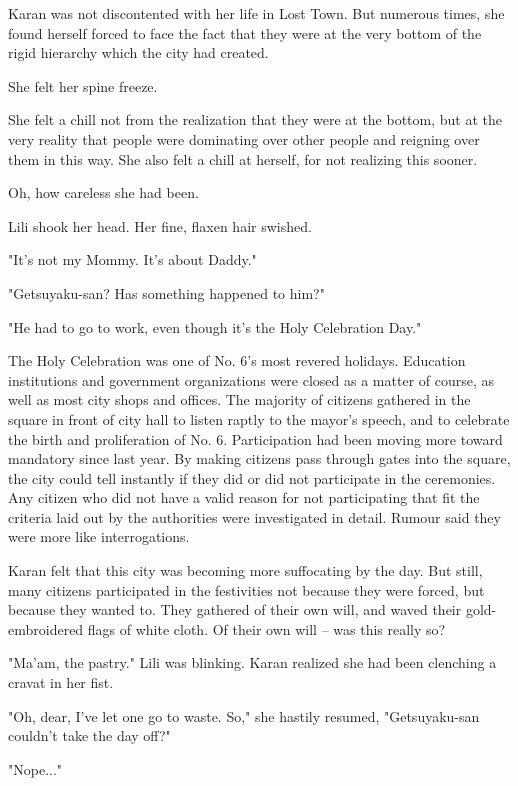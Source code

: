 Karan was not discontented with her life in Lost Town. But numerous
times, she found herself forced to face the fact that they were at the
very bottom of the rigid hierarchy which the city had created.

She felt her spine freeze.

She felt a chill not from the realization that they were at the bottom,
but at the very reality that people were dominating over other people
and reigning over them in this way. She also felt a chill at herself,
for not realizing this sooner.

Oh, how careless she had been.

Lili shook her head. Her fine, flaxen hair swished.

"It's not my Mommy. It's about Daddy."

"Getsuyaku-san? Has something happened to him?"

"He had to go to work, even though it's the Holy Celebration Day."

The Holy Celebration was one of No. 6's most revered holidays. Education
institutions and government organizations were closed as a matter of
course, as well as most city shops and offices. The majority of citizens
gathered in the square in front of city hall to listen raptly to the
mayor's speech, and to celebrate the birth and proliferation of No. 6.
Participation had been moving more toward mandatory since last year. By
making citizens pass through gates into the square, the city could tell
instantly if they did or did not participate in the ceremonies. Any
citizen who did not have a valid reason for not participating that fit
the criteria laid out by the authorities were investigated in detail.
Rumour said they were more like interrogations.

Karan felt that this city was becoming more suffocating by the day. But
still, many citizens participated in the festivities not because they
were forced, but because they wanted to. They gathered of their own
will, and waved their gold-embroidered flags of white cloth. Of their
own will -- was this really so?

"Ma'am, the pastry." Lili was blinking. Karan realized she had been
clenching a cravat in her fist.

"Oh, dear, I've let one go to waste. So," she hastily resumed,
"Getsuyaku-san couldn't take the day off?"

"Nope..."

